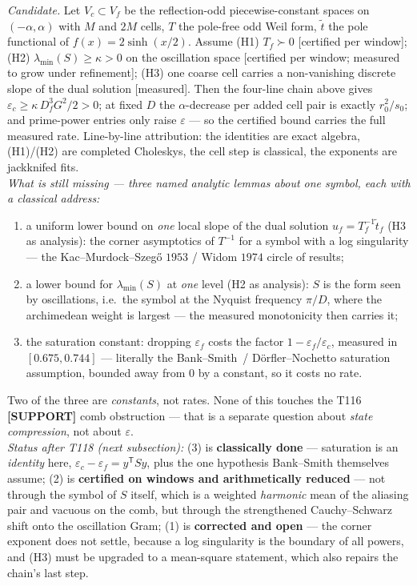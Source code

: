 \documentclass[11pt,a4paper]{article}
\begin{document}
\begin{keybox}
\emph{Candidate.} Let $V_c\subset V_f$ be the reflection-odd piecewise-constant spaces on
$(-\alpha,\alpha)$ with $M$ and $2M$ cells, $T$ the pole-free odd Weil form, $\tilde t$ the pole
functional of $f(x)=2\sinh(x/2)$. Assume (H1) $T_f\succ0$ [certified per window]; (H2)
$\lambda_{\min}(S)\ge\kappa>0$ on the oscillation space [certified per window; measured to grow
under refinement]; (H3) one coarse cell carries a non-vanishing discrete slope of the dual
solution [measured]. Then the four-line chain above gives
$\varepsilon_c\ge\kappa\,D_f^3G^2/2>0$; at fixed $D$ the $\alpha$-decrease per added cell pair
is exactly $r_0^2/s_0$; and prime-power entries only raise $\varepsilon$ --- so the certified
bound carries the full measured rate. Line-by-line attribution: the identities are exact
algebra, (H1)/(H2) are completed Choleskys, the cell step is classical, the exponents are
jackknifed fits.\\[3pt]
\emph{What is still missing --- three named analytic lemmas about one symbol, each with a
classical address:}
\begin{enumerate}[leftmargin=1.6em]
\item[\textbf{(1)}] a uniform lower bound on \emph{one} local slope of the dual solution
$u_f=T_f^{-1}\tilde t_f$ (H3 as analysis): the corner asymptotics of $T^{-1}$ for a symbol with
a log singularity --- the Kac--Murdock--Szeg\H{o} $1953$ / Widom $1974$ circle of results;
\item[\textbf{(2)}] a lower bound for $\lambda_{\min}(S)$ at \emph{one} level (H2 as analysis):
$S$ is the form seen by oscillations, i.e.\ the symbol at the Nyquist frequency $\pi/D$, where
the archimedean weight is largest --- the measured monotonicity then carries it;
\item[\textbf{(3)}] the saturation constant: dropping $\varepsilon_f$ costs the factor
$1-\varepsilon_f/\varepsilon_c$, measured in $[0.675,0.744]$ --- literally the Bank--Smith~/
D\"orfler--Nochetto saturation assumption, bounded away from $0$ by a constant, so it costs no
rate.
\end{enumerate}
Two of the three are \emph{constants}, not rates. None of this touches the T116
\textbf{[SUPPORT]} comb obstruction --- that is a separate question about \emph{state
compression}, not about $\varepsilon$.\\[3pt]
\emph{Status after T118 (next subsection):} (3) is \textbf{classically done} --- saturation is
an \emph{identity} here, $\varepsilon_c-\varepsilon_f=y^{\mathsf T}Sy$, plus the one hypothesis
Bank--Smith themselves assume; (2) is \textbf{certified on windows and arithmetically reduced}
--- not through the symbol of $S$ itself, which is a weighted \emph{harmonic} mean of the
aliasing pair and vacuous on the comb, but through the strengthened Cauchy--Schwarz shift onto
the oscillation Gram; (1) is \textbf{corrected and open} --- the corner exponent does not
settle, because a log singularity is the boundary of all powers, and (H3) must be upgraded to a
mean-square statement, which also repairs the chain's last step.
\end{keybox}
\end{document}
